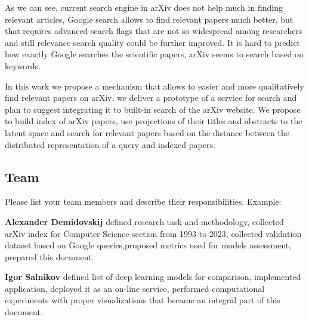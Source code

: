 \documentclass{article}
\begin{document}
    As we can see, current search engine in arXiv does not help much in finding relevant articles, Google search allows to find relevant papers much better, but that requires advanced search flags that are not so widespread among researchers and still relevance search quality could be further improved. It is hard to predict how exactly Google searches the scientific papers, arXiv seems to search based on keywords.
    
    In this work we propose a mechanism that allows to easier and more qualitatively find relevant papers on arXiv, we deliver a prototype of a service for search and plan to suggest integrating it to built-in search of the arXiv website. We propose to build index of arXiv papers, use projections of their titles and abstracts to the latent space and search for relevant papers based on the distance between the distributed representation of a query and indexed papers.
    

    \subsection{Team}
        Please list your team members and describe their responsibilities. Example:

        \textbf{Alexander Demidovskij} defined research task and methodology, collected arXiv index for Computer Science section from 1993 to 2023, collected validation dataset based on Google queries,proposed metrics used for models assessment, prepared this document.

        \textbf{Igor Salnikov} defined list of deep learning models for comparison, implemented application, deployed it as an on-line service, performed computational experiments with proper visualizations that became an integral part of this document.
\end{document}
